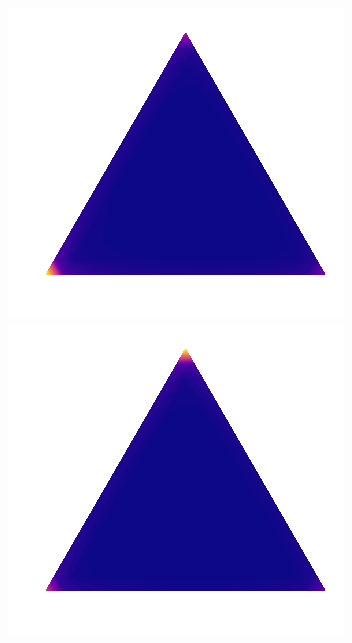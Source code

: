 \begin{figure}
 \begin{minipage}[]{.3\textwidth}
    \includegraphics[width=\textwidth]{plots/experiment_structures/triangle_0_2kld.png}
\subcaption{}
\end{minipage}
 \begin{minipage}{.3\textwidth}
    \includegraphics[width=\textwidth]{plots/experiment_structures/triangle_0_2elbo.png}

\end{minipage}
\end{figure}
